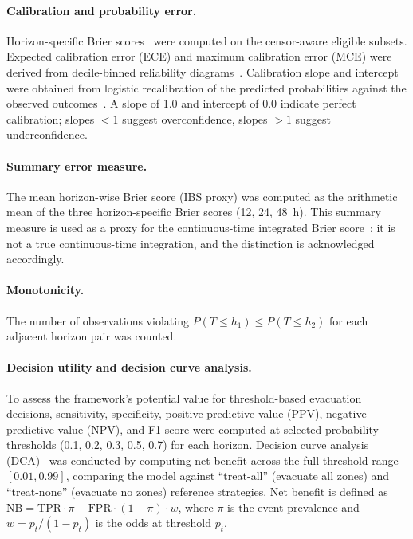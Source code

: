 \documentclass[fire,article,submit,pdftex]{../Definitions/mdpi}
\begin{document}
\paragraph{Calibration and probability error.}
Horizon-specific Brier scores~\cite{Brier1950} were computed on the censor-aware eligible subsets.
Expected calibration error (ECE) and maximum calibration error (MCE) were derived from decile-binned reliability diagrams~\cite{NiculescuMizil2005}.
Calibration slope and intercept were obtained from logistic recalibration of the predicted probabilities against the observed outcomes~\cite{VanCalster2019}.
A slope of 1.0 and intercept of 0.0 indicate perfect calibration; slopes ${<}1$ suggest overconfidence, slopes ${>}1$ suggest underconfidence.

\paragraph{Summary error measure.}
The mean horizon-wise Brier score (IBS proxy) was computed as the arithmetic mean of the three horizon-specific Brier scores (12, 24, 48~h).
This summary measure is used as a proxy for the continuous-time integrated Brier score~\cite{Graf1999}; it is not a true continuous-time integration, and the distinction is acknowledged accordingly.

\paragraph{Monotonicity.}
The number of observations violating $P(T \leq h_1) \leq P(T \leq h_2)$ for each adjacent horizon pair was counted.

\paragraph{Decision utility and decision curve analysis.}
To assess the framework's potential value for threshold-based evacuation decisions, sensitivity, specificity, positive predictive value (PPV), negative predictive value (NPV), and F1 score were computed at selected probability thresholds (0.1, 0.2, 0.3, 0.5, 0.7) for each horizon.
Decision curve analysis (DCA)~\cite{Vickers2006} was conducted by computing net benefit across the full threshold range $[0.01, 0.99]$, comparing the model against ``treat-all'' (evacuate all zones) and ``treat-none'' (evacuate no zones) reference strategies.
Net benefit is defined as $\text{NB} = \text{TPR} \cdot \pi - \text{FPR} \cdot (1 - \pi) \cdot w$, where $\pi$ is the event prevalence and $w = p_t / (1 - p_t)$ is the odds at threshold $p_t$.
\end{document}
